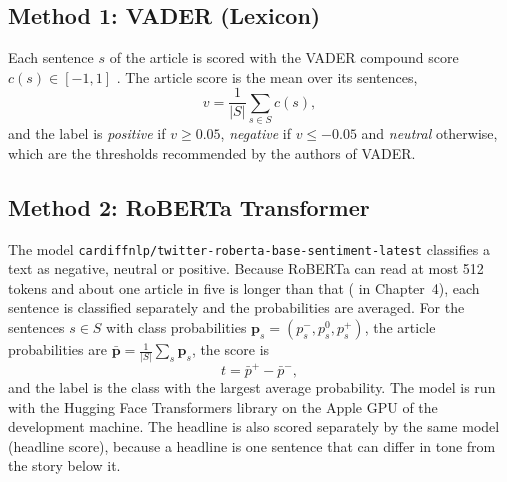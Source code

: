 \subsection{Method 1: VADER (Lexicon)}
Each sentence $s$ of the article is scored with the VADER compound score $c(s)\in[-1,1]$ \cite{hutto2014}. The article score is the mean over its sentences,
\begin{equation}
v = \frac{1}{|S|}\sum_{s\in S} c(s),
\end{equation}
and the label is \emph{positive} if $v \ge 0.05$, \emph{negative} if $v \le -0.05$ and \emph{neutral} otherwise, which are the thresholds recommended by the authors of VADER.

\subsection{Method 2: RoBERTa Transformer}
The model \texttt{cardiffnlp/twitter-roberta-base-sentiment-latest} \cite{loureiro2022,barbieri2020} classifies a text as negative, neutral or positive. Because RoBERTa can read at most 512 tokens and about one article in five is longer than that ( in Chapter~4), each sentence is classified separately and the probabilities are averaged. For the sentences $s \in S$ with class probabilities $\mathbf p_s = (p^{-}_s, p^{0}_s, p^{+}_s)$, the article probabilities are $\bar{\mathbf p} = \frac{1}{|S|}\sum_s \mathbf p_s$, the score is
\begin{equation}
t = \bar p^{+} - \bar p^{-},
\end{equation}
and the label is the class with the largest average probability. The model is run with the Hugging Face Transformers library \cite{wolf2020} on the Apple GPU of the development machine. The headline is also scored separately by the same model (headline score), because a headline is one sentence that can differ in tone from the story below it.

